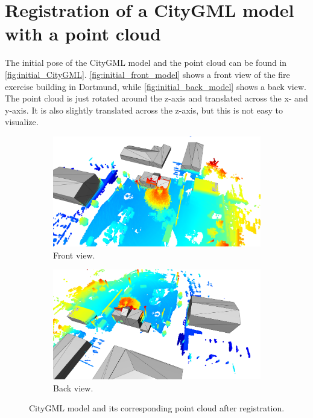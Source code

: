     \section{Registration of a CityGML model with a point cloud}
        The initial pose of the CityGML model and the point cloud can be found in \autoref{fig:initial_CityGML}.
        \autoref{fig:initial_front_model} shows a front view of the fire exercise building in Dortmund, while \autoref{fig:initial_back_model} shows a back view.
        The point cloud is just rotated around the z-axis and translated across the x- and y-axis.
        It is also slightly translated across the z-axis, but this is not easy to visualize.

        \begin{figure}[H]
            \centering
            \begin{subfigure}{1\textwidth}
                \centering
                \includegraphics[scale=0.2]{images/solution_images/final_front.png}
                \caption{Front view.}
                \label{fig:final_front_model}
            \end{subfigure}
            \hfill
            \begin{subfigure}{1\textwidth}
                \centering
                \includegraphics[scale=0.2]{images/solution_images/final_back.png}
                \caption{Back view.}
                \label{fig:final_back_model}
            \end{subfigure}
            \caption{CityGML model and its corresponding point cloud after registration.}
            \label{fig:final_CityGML}
        \end{figure}
        
